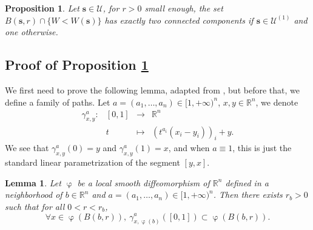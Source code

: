\documentclass[12pt]{amsart}
\newcommand{\R}{\mathbb R}
\numberwithin{equation}{section}
\numberwithin{figure}{section}
\def\s{\mathbf{s}}
\DeclareMathOperator{\phii}{\varphi}
\newtheorem{lemma}[defin]{Lemma}
\newtheorem{proposition}[defin]{Proposition}
\def\uuu{{\mathcal U}}\def\vvv{{\mathcal V}}\def\www{{\mathcal W}}\def\xxx{{\mathcal X}}
\begin{document}
\begin{proposition}\label{prop:saddle}
    Let $\s\in\uuu$, for $r>0$ small enough, the set $B(\s,r)\cap\{W < W(\s)\}$ has exactly two connected components if $\s\in\uuu^{(1)}$ and one otherwise.
\end{proposition}

\subsection{Proof of Proposition \ref{prop:saddle}}

We first need to prove the following lemma, adapted from \cite[Lemma 3.1]{AsBoMi22}, but before that, we define a family of paths. Let $a=(a_1,\ldots,a_n)\in[1,+\infty)^n$, $x,y\in\R^n$, we denote
\begin{equation*}
\begin{array}{c|ccc}
     \gamma^a_{x,y}:&[0,1]&\to&\R^n\\
     &t&\mapsto&(t^{a_i}(x_i-y_i))_i + y.
\end{array}
\end{equation*}
We see that $\gamma^a_{x,y}(0) = y$ and $\gamma^a_{x,y}(1) = x$, and when $a\equiv 1$, this is just the standard linear parametrization of the segment $[y,x]$.
\begin{lemma}\label{lem:path}
    Let $\phii$ be a local smooth diffeomorphism of $\R^n$ defined in a neighborhood of $b\in\R^n$ and $a=(a_1,\ldots,a_n)\in[1,+\infty)^n$. Then there exists $r_b>0$ such that for all $0<r<r_b$,
    \begin{equation*}
    \forall x\in\phii(B(b,r)),\ \gamma^a_{x,\phii(b)}([0,1])\subset\phii(B(b,r)).
    \end{equation*}
\end{lemma}
\end{document}
